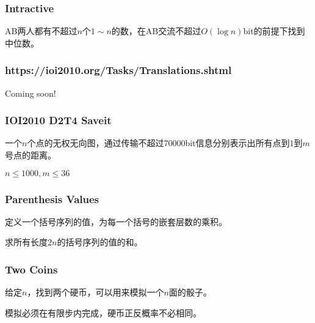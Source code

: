 \documentclass[10pt]{beamer}
\begin{document}
	\begin{frame}
		\frametitle{Intractive}
	
		AB两人都有不超过$n$个$1\sim n$的数，在AB交流不超过$O(\log n)$bit的前提下找到中位数。
	
	\end{frame}
	\begin{frame}
		\frametitle{https://ioi2010.org/Tasks/Translations.shtml}
	
		Coming soon!
	
	\end{frame}
	\begin{frame}
		\frametitle{IOI2010 D2T4 Saveit}
	
		一个$n$个点的无权无向图，通过传输不超过70000bit信息分别表示出所有点到$1$到$m$号点的距离。
		
		$n\le 1000,m\le 36$
	\end{frame}
	\begin{frame}
		\frametitle{Parenthesis Values}
	
		定义一个括号序列的值，为每一个括号的嵌套层数的乘积。

		求所有长度$2n$的括号序列的值的和。
	
	\end{frame}
	\begin{frame}
		\frametitle{Two Coins}
	
		给定$n$，找到两个硬币，可以用来模拟一个$n$面的骰子。

		模拟必须在有限步内完成，硬币正反概率不必相同。
	
	\end{frame}
\end{document}

